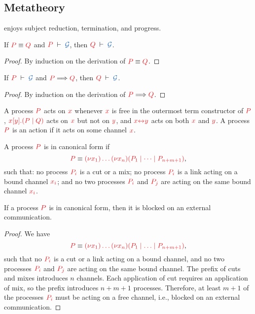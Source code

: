 \documentclass[UKenglish]{llncs}
\begin{document}
\subsection{Metatheory}
\label{sec:nc-metatheory}
\nodcap enjoys subject reduction, termination, and progress.
\begin{lemma}\label{lem:nc-preservation-equiv}
  If $\tm{P}\equiv\tm{Q}$ and $\seq[P]{\mathcal{G}}$, then $\seq[Q]{\mathcal{G}}$.
\end{lemma} 
\begin{proof}
  By induction on the derivation of $\tm{P}\equiv\tm{Q}$.
\end{proof}
\begin{theorem}[Preservation]\label{thm:nc-preservation}
  If $\seq[P]{\mathcal{G}}$ and $\reducesto{P}{Q}$, then $\seq[Q]{\mathcal{G}}$.
\end{theorem} 
\begin{proof}
  By induction on the derivation of $\reducesto{P}{Q}$.
\end{proof}
\begin{definition}[Actions]
  A process $\tm{P}$ acts on $\tm{x}$ whenever $\tm{x}$ is free in the outermost
  term constructor of $\tm{P}$, \eg $\tm{\cpSend{x}{y}{P}{Q}}$ acts on $\tm{x}$
  but not on $\tm{y}$, and $\tm{\cpLink{x}{y}}$ acts on both $\tm{x}$ and $\tm{y}$.
  A process $\tm{P}$ is an action if it acts on some channel $\tm{x}$.
\end{definition}
\begin{definition}
  A process $\tm{P}$ is in canonical form if
  \[
  \tm{P} \equiv \tm{\piNew{x_1}{\dots\piNew{x_n}{(P_1 \mid \dots \mid P_{n+m+1})}}},
  \]
  such that: no process $\tm{P_i}$ is a cut or a mix; no process $\tm{P_i}$ is a link acting on a bound channel $\tm{x_i}$; and no two processes $\tm{P_i}$ and $\tm{P_j}$ are acting on the same bound channel $\tm{x_i}$.
\end{definition}
\begin{corollary}
  If a process $\tm{P}$ is in canonical form, then it is blocked on an external communication.
\end{corollary}
\begin{proof}
  We have
  \[
  \tm{P} \equiv \tm{\piNew{x_1}{\dots\piNew{x_n}{(P_1 \ppar \dots \ppar P_{n+m+1})}}},
  \]
  such that no $\tm{P_i}$ is a cut or a link acting on a bound channel, and no two processes $\tm{P_i}$ and $\tm{P_j}$ are acting on the same bound channel. The prefix of cuts and mixes introduces $n$ channels. Each application of cut requires an application of mix, so the prefix introduces $n+m+1$ processes. Therefore, at least $m+1$ of the processes $\tm{P_i}$ must be acting on a free channel, i.e., blocked on an external communication.
\end{proof}
\end{document}
